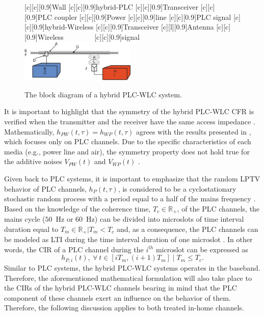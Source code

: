 \documentclass[journal]{IEEEtran}
\begin{document}
\begin{figure}[h]
	\centering
	[c][0.9]{Wall}
	[c][0.9]{hybrid-PLC}
	[c][0.9]{Transceiver}
	[c][0.9]{PLC coupler}
	[c][0.9]{Power}
	[c][0.9]{line}
	[c][0.9]{PLC signal}
	[c][0.9]{hybrid-Wireless}
	[c][0.9]{Transceiver}
	[l][0.9]{Antenna}
	[c][0.9]{Wireless$~~~~~~~~~~~~~~~~~~$}
	[c][0.9]{signal$~~~~~~~~~~~~~~~~~$}
	\includegraphics[width=0.49\textwidth]{images/Hybrid_channel.eps}
	\caption{The block diagram of a hybrid PLC-WLC system.}
	\label{Hybchannel}
\end{figure}

It is important to highlight that the symmetry of the hybrid \ac{PLC}-\ac{WLC} \ac{CFR} is verified when the transmitter and the receiver have the same access impedance \cite{thiago:hyb}. Mathematically, $h_{PW}(t,\tau)=h_{WP}(t,\tau)$ agrees with the results presented in \cite{Galli:indoor}, which focuses only on \ac{PLC} channels. Due to the specific characteristics of each media (e.g., power line and air), the symmetry property does not hold true for the additive noises $V_{PW}(t)$ and $V_{WP}(t)$ \cite{thiago:hyb}. 

Given back to \ac{PLC} systems, it is important to emphasize that the random \ac{LPTV} behavior of \ac{PLC} channels, $h_P(t,\tau)$, is considered to be a cyclostationary stochastic random process with a period equal to a half of the mains frequency \cite{Colen:TCRA}. Based on the knowledge of the coherence time, $T_c \in \mathbb{R}_+$, of the \ac{PLC} channels, the mains cycle ($50$~Hz or $60$~Hz) can be divided into microslots of time interval duration equal to $T_m\in \mathbb{R}_+|T_m < T_c$ and, as a consequence, the \ac{PLC} channels can be modeled as \ac{LTI} during the time interval duration of one microslot \cite{Colen2016}. In other words, the \ac{CIR} of a \ac{PLC} channel during the $i^{th}$ microslot can be expressed as
\begin{equation} \label{discreteh}
h_{P,i}(t),~\forall~t \in [iT_{m}, (i+1)T_{m}] \mid T_{m} \le T_{c}.
\end{equation}
Similar to \ac{PLC} systems, the hybrid \ac{PLC}-\ac{WLC} systems operates in the baseband. Therefore, the aforementioned mathematical formulation will also take place to the \acp{CIR} of the hybrid \ac{PLC}-\ac{WLC} channels bearing in mind that the \ac{PLC} component of these channels exert an influence on the behavior of them. Therefore, the following discussion applies to both treated in-home channels.
\end{document}
